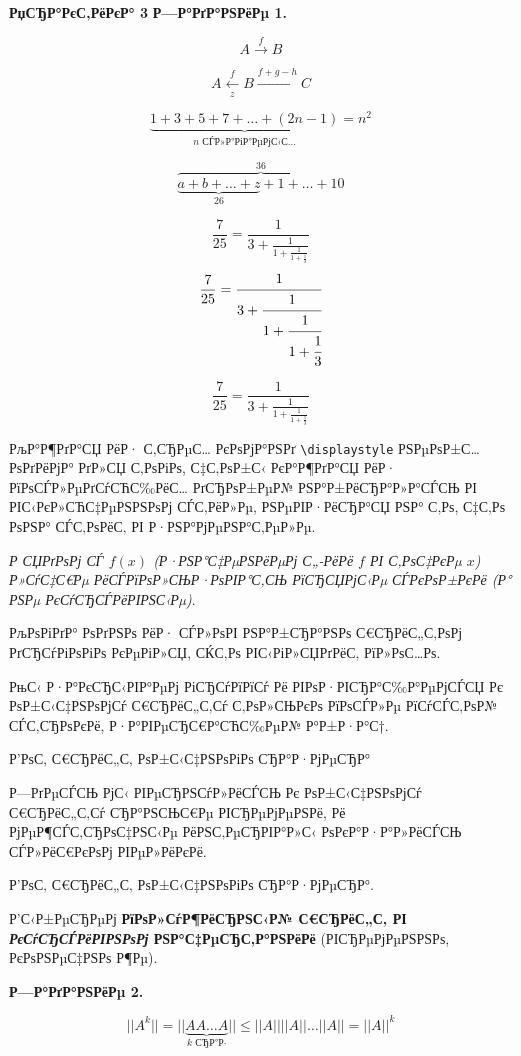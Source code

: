 \documentclass{article}
\begin{document}
\Large
\begin{center}
\textbf{РџСЂР°РєС‚РёРєР° 3}
\textbf{Р—Р°РґР°РЅРёРµ 1.}
\end{center}

$$A\stackrel{f}{\longrightarrow}B$$

$$ A\xleftarrow[z]{f}B\xrightarrow{f+g-h}C $$

$$
    \underbrace{1+3+5+7+
    \ldots+(2n-1)}_{\mbox{$n$ СЃР»Р°РіР°РµРјС‹С…}}=n^2
$$

$$
    \overbrace{\underbrace{
                a+b+\ldots+z
                    }_{26}+1+
    \ldots+10}^{36}
$$


$$
    \frac{7}{25}=
    \frac{1}{
    3+\frac{1}{
     1+\frac{1}{
      1+\frac{1}{3}}}}
$$
$$
    \frac{7}{25}=
    \cfrac{1}{
    3+\cfrac{1}{
     1+\cfrac{1}{
      1+\cfrac{1}{3}}}}
$$

$$
    \frac{7}{25}=
    \frac{1}{\displaystyle
       3+\frac{1}{\displaystyle
            1+\frac{1}{\displaystyle
                 1+\frac{1}{3}}}}
$$

РљР°Р¶РґР°СЏ РёР· С‚СЂРµС… РєРѕРјР°РЅРґ \verb"\displaystyle" РЅРµРѕР±С…РѕРґРёРјР° РґР»СЏ С‚РѕРіРѕ, С‡С‚РѕР±С‹ РєР°Р¶РґР°СЏ РёР· РїРѕСЃР»РµРґСѓСЋС‰РёС…
РґСЂРѕР±РµР№ РЅР°Р±РёСЂР°Р»Р°СЃСЊ РІ РІС‹РєР»СЋС‡РµРЅРЅРѕРј СЃС‚РёР»Рµ, РЅРµРІР·РёСЂР°СЏ РЅР° С‚Рѕ, С‡С‚Рѕ РѕРЅР° СЃС‚РѕРёС‚ РІ Р·РЅР°РјРµРЅР°С‚РµР»Рµ.

\textit{Р СЏРґРѕРј СЃ $f(x)$ \textup{(}Р·РЅР°С‡РµРЅРёРµРј С„-РёРё $f$ РІ С‚РѕС‡РєРµ $x$\textup{)} Р»СѓС‡С€Рµ РёСЃРїРѕР»СЊР·РѕРІР°С‚СЊ РїСЂСЏРјС‹Рµ СЃРєРѕР±РєРё (Р° РЅРµ РєСѓСЂСЃРёРІРЅС‹Рµ)}.

РљРѕРіРґР° РѕРґРЅРѕ РёР· {\scriptsize СЃР»РѕРІ} РЅР°Р±СЂР°РЅРѕ С€СЂРёС„С‚РѕРј РґСЂСѓРіРѕРіРѕ РєРµРіР»СЏ, СЌС‚Рѕ РІС‹РіР»СЏРґРёС‚ РїР»РѕС…Рѕ.

{\footnotesize РњС‹ Р·Р°РєСЂС‹РІР°РµРј РіСЂСѓРїРїСѓ Рё РІРѕР·РІСЂР°С‰Р°РµРјСЃСЏ Рє РѕР±С‹С‡РЅРѕРјСѓ С€СЂРёС„С‚Сѓ С‚РѕР»СЊРєРѕ РїРѕСЃР»Рµ РїСѓСЃС‚РѕР№ СЃС‚СЂРѕРєРё, Р·Р°РІРµСЂС€Р°СЋС‰РµР№ Р°Р±Р·Р°С†.

}
Р’РѕС‚ С€СЂРёС„С‚ РѕР±С‹С‡РЅРѕРіРѕ СЂР°Р·РјРµСЂР°


{\footnotesize

Р—РґРµСЃСЊ РјС‹ РІРµСЂРЅСѓР»РёСЃСЊ Рє РѕР±С‹С‡РЅРѕРјСѓ С€СЂРёС„С‚Сѓ СЂР°РЅСЊС€Рµ РІСЂРµРјРµРЅРё, Рё РјРµР¶СЃС‚СЂРѕС‡РЅС‹Рµ РёРЅС‚РµСЂРІР°Р»С‹ РѕРєР°Р·Р°Р»РёСЃСЊ СЃР»РёС€РєРѕРј РІРµР»РёРєРё.}

Р’РѕС‚ С€СЂРёС„С‚ РѕР±С‹С‡РЅРѕРіРѕ СЂР°Р·РјРµСЂР°.

Р’С‹Р±РµСЂРµРј \textbf{РїРѕР»СѓР¶РёСЂРЅС‹Р№ С€СЂРёС„С‚ РІ \textit{РєСѓСЂСЃРёРІРЅРѕРј} РЅР°С‡РµСЂС‚Р°РЅРёРё} (РІСЂРµРјРµРЅРЅРѕ, РєРѕРЅРµС‡РЅРѕ Р¶Рµ).
\newpage
\begin{center}
\textbf{Р—Р°РґР°РЅРёРµ 2.}
\end{center}
$$
    ||A^k||=
    ||\underbrace{AA\ldots A}_{\mbox{$k$ СЂР°Р·}}||
    \leq ||A||||A||\ldots ||A||
    =||A||^k
$$
\end{document}
